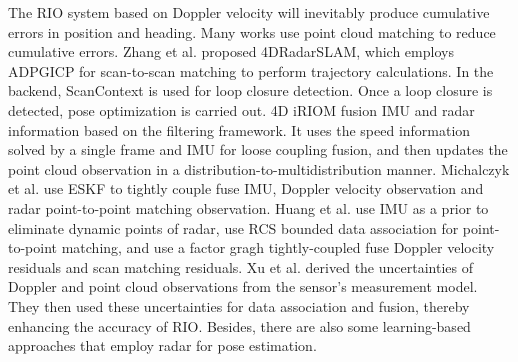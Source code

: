 The RIO system based on Doppler velocity will inevitably produce cumulative errors in position and heading. Many works use point cloud matching to reduce cumulative errors. Zhang et al. proposed 4DRadarSLAM\cite{zhang20234dradarslam}, which employs ADPGICP for scan-to-scan matching to perform trajectory calculations. In the backend, ScanContext\cite{kim2018scan} is used for loop closure detection. Once a loop closure is detected, pose optimization is carried out.
4D iRIOM\cite{zhuang20234d} fusion IMU and radar information based on the filtering framework. It uses the speed information solved by a single frame and IMU for loose coupling fusion, and then updates the point cloud observation in a distribution-to-multidistribution manner. Michalczyk et al.\cite{michalczyk2022tightly} \cite{michalczyk2023multi} use ESKF to tightly couple fuse IMU, Doppler velocity observation and radar point-to-point matching observation. Huang et al.\cite{huang2024less} use IMU as a prior to eliminate dynamic points of radar, use RCS bounded data association for point-to-point matching, and use a factor gragh\cite{loeliger2004introduction} tightly-coupled  fuse  Doppler velocity residuals and scan matching residuals. Xu et al.\cite{xu2024modeling} derived the uncertainties of Doppler and point cloud observations from the sensor's measurement model. They then used these uncertainties for data association and fusion, thereby enhancing the accuracy of RIO.
Besides, there are also some learning-based approaches \cite{lu2020milliego,10160681,yin2021rall} that employ radar for pose estimation.

